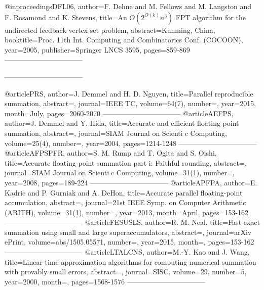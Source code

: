 @inproceedings{DFL06,
	author={F. Dehne and M. Fellows and M. Langston and F. Rosamond and K. Stevens},
	title={An $O(2^{O(k)} n^3 )$ {FPT} algorithm for the undirected feedback vertex set problem},
	abstract={Kunming, China},
	booktitle={Proc. 11th Int. Computing and Combinatorics Conf. (COCOON)},
	year={2005},
	publisher={Springer LNCS 3595},
	pages={859-869}
} ---------------------------------



---------------------------------

@article{PRS,
	author={J. Demmel and H. D. Nguyen},
	title={Parallel reproducible summation},
	abstract={},
	journal={IEEE TC},
	volume={64(7)},
	number={},
	year={2015},
	month={July},
	pages={2060-2070}
} ---------------------------------
@article{AEFPS,
	author={J. Demmel and Y. Hida},
	title={Accurate and efficient floating point summation},
	abstract={},
	journal={SIAM Journal on Scientic Computing},
	volume={25(4)},
	number={},
	year={2004},
	pages={1214-1248}
} ---------------------------------
@article{AFPSPFR,
	author={S. M. Rump and T. Ogita and S. Oishi},
	title={Accurate floating-point summation part i: Faithful rounding},
	abstract={},
	journal={SIAM Journal on Scientic Computing},
	volume={31(1)},
	number={},
	year={2008},
	pages={189-224}
} ---------------------------------
@article{APFPA,
	author={E. Kadric and P. Gurniak and A. DeHon},
	title={Accurate parallel floating-point accumulation},
	abstract={},
	journal={21st IEEE Symp. on Computer Arithmetic (ARITH)},
	volume={31(1)},
	number={},
	year={2013},
	month={April},
	pages={153-162}
} ---------------------------------
@article{FESUSLS,
	author={R. M. Neal},
	title={Fast exact summation using small and large superaccumulators},
	abstract={},
	journal={arXiv ePrint},
	volume={abs/1505.05571},
	number={},
	year={2015},
	month={},
	pages={153-162}
} ---------------------------------
@article{LTALCNS,
	author={M.-Y. Kao and J. Wang},
	title={Linear-time approximation algorithms for computing numerical summation with provably small errors},
	abstract={},
	journal={SISC},
	volume={29},
	number={5},
	year={2000},
	month={},
	pages={1568-1576}
} ---------------------------------
